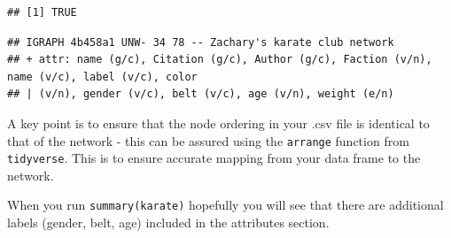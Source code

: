\documentclass[
]{book}
\newenvironment{Shaded}{\begin{snugshade}}{\end{snugshade}}
\newcommand{\AttributeTok}[1]{\textcolor[rgb]{0.13,0.29,0.53}{#1}}
\newcommand{\CommentTok}[1]{\textcolor[rgb]{0.56,0.35,0.01}{\textit{#1}}}
\newcommand{\FunctionTok}[1]{\textcolor[rgb]{0.13,0.29,0.53}{\textbf{#1}}}
\newcommand{\NormalTok}[1]{#1}
\newcommand{\OtherTok}[1]{\textcolor[rgb]{0.56,0.35,0.01}{#1}}
\newcommand{\SpecialCharTok}[1]{\textcolor[rgb]{0.81,0.36,0.00}{\textbf{#1}}}
\newcommand{\StringTok}[1]{\textcolor[rgb]{0.31,0.60,0.02}{#1}}
\begin{document}
\begin{verbatim}
## [1] TRUE
\end{verbatim}

\begin{Shaded}
\end{Shaded}

\begin{verbatim}
## IGRAPH 4b458a1 UNW- 34 78 -- Zachary's karate club network
## + attr: name (g/c), Citation (g/c), Author (g/c), Faction (v/n), name (v/c), label (v/c), color
## | (v/n), gender (v/c), belt (v/c), age (v/n), weight (e/n)
\end{verbatim}

A key point is to ensure that the node ordering in your .csv file is identical to that of the network - this can be assured using the \texttt{arrange} function from \texttt{tidyverse}. This is to ensure accurate mapping from your data frame to the network.

When you run \texttt{summary(karate)} hopefully you will see that there are additional labels (gender, belt, age) included in the attributes section.
\end{document}
